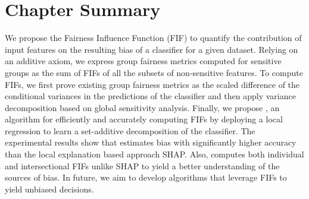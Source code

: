 \section{Chapter Summary}
We propose the Fairness Influence Function (FIF) to quantify the contribution of input features on the resulting bias of a classifier for a given dataset. Relying on an additive axiom, we express group fairness metrics computed for sensitive groups as the sum of FIFs of all the subsets of non-sensitive features. To compute FIFs, we first prove existing group fairness metrics as the scaled difference of the conditional variances in the predictions of the classifier and then apply variance decomposition based on global sensitivity analysis. Finally, we propose {\fairXplainer}, an algorithm for efficiently and accurately computing FIFs by deploying a local regression to learn a set-additive decomposition of the classifier. The experimental results show that {\fairXplainer} estimates bias with significantly higher accuracy than the local explanation based approach SHAP. Also, {\fairXplainer} computes both individual and intersectional FIFs unlike SHAP to yield a better understanding of the sources of bias.
In future,  we aim to develop algorithms that leverage FIFs to yield unbiased decisions.